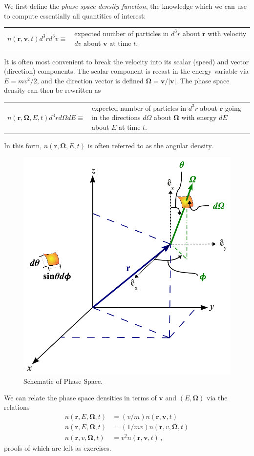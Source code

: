 We first define the \textit{phase space density function}, the knowledge which we can use to compute essentially all quantities of interest:
\begin{center}
  \begin{tabular}{cp{7.0cm}}
    $n(\mathbf{r},\mathbf{v},t)d^3r d^3v \equiv $ &
    expected number of particles in  $d^3r$  about  $\mathbf{r}$  with velocity  $dv$ about  $\mathbf{v}$ at time $t$.  
  \end{tabular}
\end{center}
It is often most convenient to break the velocity into its scalar (speed) and vector (direction) components.  The scalar component is recast in the energy variable via $E = mv^2/2$, and the direction vector is defined $\mathbf{\Omega}=\mathbf{v}/|\mathbf{v}|$.  The phase space density can then be rewritten as
\begin{center}
  \begin{tabular}{cp{7.0cm}}
    $n(\mathbf{r},\mathbf{\Omega},E,t)d^3r d\Omega dE \equiv $ &
    expected number of particles in  $d^3r$  about  $\mathbf{r}$  going in the directions $d\Omega$ about $\mathbf{\Omega}$ with energy  $dE$ about  $E$ at time $t$.  
  \end{tabular}
\end{center}
In this form, $n(\mathbf{r},\mathbf{\Omega},E,t)$ is often referred to as the angular density.

\begin{figure}
    \begin{center}
    \includegraphics[keepaspectratio, width = 2.7 in]{images/phase_space}
    \end{center}
    \caption{Schematic of Phase Space.}
    \label{fig:phase_space}
\end{figure}

We can relate the phase space densities in terms of $\mathbf{v}$ and $(E,\mathbf{\Omega})$ via the relations
\begin{equation}
 \begin{split}
  n(\mathbf{r},E,\mathbf{\Omega},t) &= (v/m) n(\mathbf{r},\mathbf{v},t) \\
  n(\mathbf{r},E,\mathbf{\Omega},t) &= (1/mv) n(\mathbf{r},v,\mathbf{\Omega},t) \\
  n(\mathbf{r},v,\mathbf{\Omega},t) &= v^2 n(\mathbf{r},\mathbf{v},t) \, ,
 \end{split}
 \label{eq:densityrelations}
\end{equation}
proofs of which are left as exercises.

